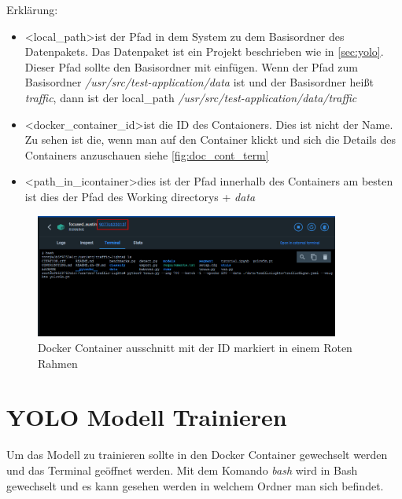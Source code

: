 Erklärung:
\begin{itemize}
    \item \textless local\_path\textgreater ist der Pfad in dem System zu dem Basisordner des Datenpakets. Das Datenpaket ist ein Projekt beschrieben wie in \autoref{sec:yolo}. Dieser Pfad sollte den Basisordner mit einfügen. Wenn der Pfad zum Basisordner \textit{/usr/src/test-application/data} ist und der Basisordner heißt \textit{traffic}, dann ist der local\_path \textit{/usr/src/test-application/data/traffic}
    \item \textless docker\_container\_id\textgreater ist die ID des Contaioners. Dies ist nicht der Name. Zu sehen ist die, wenn man auf den Container klickt und sich die Details des Containers anzuschauen siehe \autoref{fig:doc_cont_term}
    \item \textless path\_in\_icontainer\textgreater dies ist der Pfad innerhalb des Containers am besten ist dies der Pfad des Working directorys + \textit{data}
\end{itemize}

\begin{figure}
    \centering
    \includegraphics[width=10cm]{data/img/docker_container_terminal.png}
    \caption{Docker Container ausschnitt mit der ID markiert in einem Roten Rahmen}
    \label{fig:doc_cont_term}
\end{figure}

\section{YOLO Modell Trainieren}
Um das Modell zu trainieren sollte in den Docker Container gewechselt werden und das Terminal geöffnet werden. Mit dem Komando \textit{bash} wird in Bash gewechselt und es kann gesehen werden in welchem Ordner man sich befindet. 

